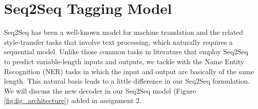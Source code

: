 \documentclass[11pt,a4paper]{article}
\begin{document}





\section{Seq2Seq Tagging Model} \label{ssec:model}

Seq2Seq \cite{seq2seq_2014} has been a well-known model for machine translation and the related style-transfer tasks that involve text processing, which naturally requires a sequential model. Unlike those common tasks in literature that employ Seq2Seq to predict variable-length inputs and outputs, we tackle with the Name Entity Recognition (NER) tasks in which the input and output are basically of the same length. This natural basis leads to a little difference in our Seq2Seq formulation. We will discuss the new decoder in our Seq2Seq model (Figure \ref{fig:fig_architecture}) added in assignment 2.
\end{document}
